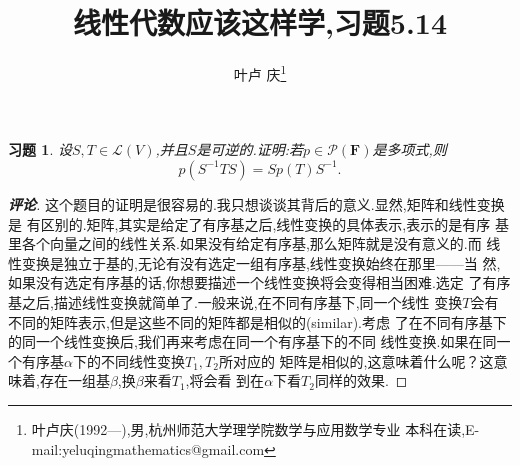 ﻿\documentclass[a4paper]{article}
\newtheorem*{exa}{习题}
\newenvironment{example}
{\bigskip\begin{mdframed}\begin{exa}}
    {\end{exa}\end{mdframed}\bigskip}
\begin{document}
\title{\huge{\bf{线性代数应该这样学,习题5.14}}} \author{\small{叶卢
    庆\footnote{叶卢庆(1992---),男,杭州师范大学理学院数学与应用数学专业
      本科在读,E-mail:yeluqingmathematics@gmail.com}}}
\maketitle\ni
\begin{example}
  设$S,T\in \mathcal{L}(V)$,并且$S$是可逆的.证明:若$p\in
  \mathcal{P}(\mathbf{F})$是多项式,则
$$
p(S^{-1}TS)=Sp(T)S^{-1}.
$$
\end{example}
\begin{proof}[\textbf{评论}]
  这个题目的证明是很容易的.我只想谈谈其背后的意义.显然,矩阵和线性变换是
  有区别的.矩阵,其实是给定了有序基之后,线性变换的具体表示,表示的是有序
  基里各个向量之间的线性关系.如果没有给定有序基,那么矩阵就是没有意义的.而
  线性变换是独立于基的,无论有没有选定一组有序基,线性变换始终在那里——当
  然,如果没有选定有序基的话,你想要描述一个线性变换将会变得相当困难.选定
  了有序基之后,描述线性变换就简单了.一般来说,在不同有序基下,同一个线性
  变换$T$会有不同的矩阵表示,但是这些不同的矩阵都是相似的(similar).考虑
  了在不同有序基下的同一个线性变换后,我们再来考虑在同一个有序基下的不同
  线性变换.如果在同一个有序基$\alpha$下的不同线性变换$T_1,T_2$所对应的
  矩阵是相似的,这意味着什么呢？这意味着,存在一组基$\beta$,换$\beta$来看$T_1$,将会看
  到在$\alpha$下看$T_2$同样的效果.
\end{proof}
\end{document}
